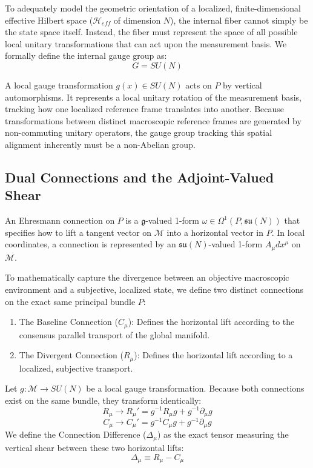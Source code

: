 \documentclass[12pt,openany]{book}
\theoremstyle{plain}
\theoremstyle{definition}
\theoremstyle{remark}
\begin{document}
To adequately model the geometric orientation of a localized, finite-dimensional effective Hilbert space ($\mathcal{H}_{eff}$ of dimension $N$), the internal fiber cannot simply be the state space itself. Instead, the fiber must represent the space of all possible local unitary transformations that can act upon the measurement basis. We formally define the internal gauge group as:$$G = SU(N)$$

A local gauge transformation $g(x) \in SU(N)$ acts on $P$ by vertical automorphisms. It represents a local unitary rotation of the measurement basis, tracking how one localized reference frame translates into another. Because transformations between distinct macroscopic reference frames are generated by non-commuting unitary operators, the gauge group tracking this spatial alignment inherently must be a non-Abelian group.

\subsection{Dual Connections and the Adjoint-Valued Shear} 
An Ehresmann connection on $P$ is a $\mathfrak{g}$-valued 1-form $\omega \in \Omega^1(P, \mathfrak{su}(N))$ that specifies how to lift a tangent vector on $\mathcal{M}$ into a horizontal vector in $P$. In local coordinates, a connection is represented by an $\mathfrak{su}(N)$-valued 1-form $A_\mu dx^\mu$ on $\mathcal{M}$.

To mathematically capture the divergence between an objective macroscopic environment and a subjective, localized state, we define two distinct connections on the exact same principal bundle $P$:

\begin{enumerate}
	\item The Baseline Connection ($C_\mu$): Defines the horizontal lift according to the consensus parallel transport of the global manifold.
	\item The Divergent Connection ($R_\mu$): Defines the horizontal lift according to a localized, subjective transport.
\end{enumerate}
	Let $g: \mathcal{M} \to SU(N)$ be a local gauge transformation. Because both connections exist on the same bundle, they transform identically:$$R_\mu \to R_\mu' = g^{-1}R_\mu g + g^{-1}\partial_\mu g$$$$C_\mu \to C_\mu' = g^{-1}C_\mu g + g^{-1}\partial_\mu g$$We define the Connection Difference ($\Delta_\mu$) as the exact tensor measuring the vertical shear between these two horizontal lifts:$$\Delta_\mu \equiv R_\mu - C_\mu$$
	
\end{document}
